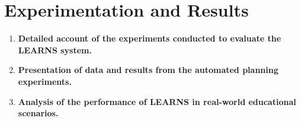 \section{Experimentation and Results}
\begin{enumerate}
    \item \textbf{Detailed account of the experiments conducted to evaluate the LEARNS system.}
    \item \textbf{Presentation of data and results from the automated planning experiments.}
    \item \textbf{Analysis of the performance of LEARNS in real-world educational scenarios.}
\end{enumerate}
